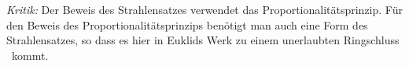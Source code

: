 {\em Kritik:} Der Beweis des Strahlensatzes verwendet das
Proportionalitätsprinzip.
Für den Beweis des Proportionalitätsprinzips benötigt man auch eine
Form des Strahlensatzes, so dass es hier in Euklids Werk zu einem
unerlaubten \glqq Ringschluss \grqq\ kommt.


%
%
















